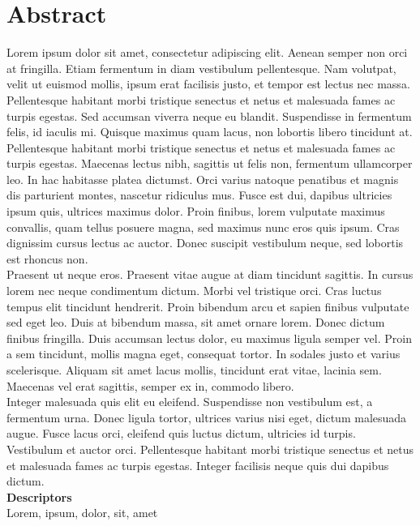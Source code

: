 \chapter*{Abstract}

\thispagestyle{fancy}
Lorem ipsum dolor sit amet, consectetur adipiscing elit. Aenean semper non orci at fringilla. Etiam fermentum in diam vestibulum pellentesque. Nam volutpat, velit ut euismod mollis, ipsum erat facilisis justo, et tempor est lectus nec massa. Pellentesque habitant morbi tristique senectus et netus et malesuada fames ac turpis egestas. Sed accumsan viverra neque eu blandit. Suspendisse in fermentum felis, id iaculis mi. Quisque maximus quam lacus, non lobortis libero tincidunt at. Pellentesque habitant morbi tristique senectus et netus et malesuada fames ac turpis egestas. Maecenas lectus nibh, sagittis ut felis non, fermentum ullamcorper leo. In hac habitasse platea dictumst. Orci varius natoque penatibus et magnis dis parturient montes, nascetur ridiculus mus. Fusce est dui, dapibus ultricies ipsum quis, ultrices maximus dolor. Proin finibus, lorem vulputate maximus convallis, quam tellus posuere magna, sed maximus nunc eros quis ipsum. Cras dignissim cursus lectus ac auctor. Donec suscipit vestibulum neque, sed lobortis est rhoncus non.\\

Praesent ut neque eros. Praesent vitae augue at diam tincidunt sagittis. In cursus lorem nec neque condimentum dictum. Morbi vel tristique orci. Cras luctus tempus elit tincidunt hendrerit. Proin bibendum arcu et sapien finibus vulputate sed eget leo. Duis at bibendum massa, sit amet ornare lorem. Donec dictum finibus fringilla. Duis accumsan lectus dolor, eu maximus ligula semper vel. Proin a sem tincidunt, mollis magna eget, consequat tortor. In sodales justo et varius scelerisque. Aliquam sit amet lacus mollis, tincidunt erat vitae, lacinia sem. Maecenas vel erat sagittis, semper ex in, commodo libero.\\

Integer malesuada quis elit eu eleifend. Suspendisse non vestibulum est, a fermentum urna. Donec ligula tortor, ultrices varius nisi eget, dictum malesuada augue. Fusce lacus orci, eleifend quis luctus dictum, ultricies id turpis. Vestibulum et auctor orci. Pellentesque habitant morbi tristique senectus et netus et malesuada fames ac turpis egestas. Integer facilisis neque quis dui dapibus dictum.\\

\textbf{Descriptors}\\
Lorem, ipsum, dolor, sit, amet
